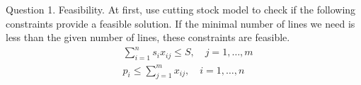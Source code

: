     \begin{frame}{Question}
        1. Feasibility. At first, use cutting stock model to check if the following constraints provide a feasible solution. If the minimal number of lines we need is less than the given number of lines, these constraints are feasible.
        \[\begin{split}
        & \sum_{i=1}^n s_i x_{ij} \leq S, \quad j=1,\ldots,m \\
        & p_i \leq \sum_{j=1}^{m} x_{ij},\quad i=1,\ldots,n
        \end{split}\]

    \end{frame}


